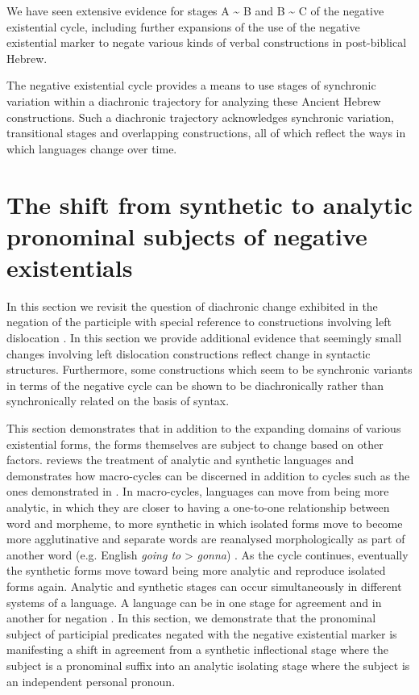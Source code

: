 \documentclass[output=paper,colorlinks,citecolor=brown,draft,draftmode]{langscibook}
\begin{document}
We have seen extensive evidence for stages A {\textasciitilde} B and B {\textasciitilde} C of the negative existential cycle, including further expansions of the use of the negative existential marker to negate various kinds of verbal constructions in post-biblical Hebrew. 

The negative existential cycle provides a means to use stages of synchronic variation within a diachronic trajectory for analyzing these Ancient Hebrew constructions. Such a diachronic trajectory acknowledges synchronic variation, transitional stages and overlapping constructions, all of which reflect the ways in which languages change over time.

\section{The shift from synthetic to analytic pronominal subjects of
negative existentials}\label{sec:Hebrew-4}

In this section we revisit the question of diachronic change exhibited in
the negation of the participle with special reference to constructions
involving left dislocation \citep{NaudeMiller2016b}. In
this section we provide additional evidence that seemingly small changes
involving left dislocation constructions reflect change in syntactic
structures. Furthermore, some constructions which seem to be synchronic
variants in terms of the negative cycle can be shown to be diachronically
rather than synchronically related on the basis of syntax. 

This section demonstrates that in addition to the expanding domains of
various existential forms, the forms themselves are subject to change based
on other factors. \Textcite[7]{Gelderen2016} reviews the treatment of
analytic and synthetic languages and demonstrates how macro-cycles can be
discerned in addition to cycles such as the ones demonstrated in
. In macro-cycles, languages can move from being more
analytic, in which they are closer to having a one-to-one relationship
between word and morpheme, to more synthetic in which isolated forms move
to become more agglutinative and separate words are reanalysed
morphologically as part of another word (e.g. English \textit{going
to} > \textit{gonna})  \parencite[see][6--8 for a
description of the development of this notion]{Gelderen2016}. As the cycle continues,
eventually the synthetic forms move toward being more analytic and
reproduce isolated forms again. Analytic and synthetic stages can occur
simultaneously in different systems of a language. A language can be in one
stage for agreement and in another for negation 
\parencite[7]{Gelderen2016}. In this section, we demonstrate that the
pronominal subject of participial predicates negated with the negative
existential marker is manifesting a shift in agreement from a synthetic
inflectional stage where the subject is a pronominal suffix into an
analytic isolating stage where the subject is an independent personal
pronoun. 
\end{document}
